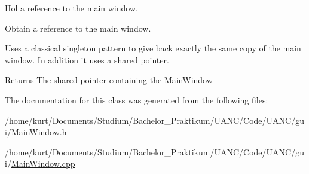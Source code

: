 Hol a reference to the main window. 

Obtain a reference to the main window.

Uses a classical singleton pattern to give back exactly the same copy of the main window. In addition it uses a shared pointer.

\begin{DoxyReturn}{Returns}
The shared pointer containing the \hyperlink{classuanc_1_1gui_1_1_main_window}{Main\+Window} 
\end{DoxyReturn}


The documentation for this class was generated from the following files\+:\begin{DoxyCompactItemize}
\item 
/home/kurt/\+Documents/\+Studium/\+Bachelor\+\_\+\+Praktikum/\+U\+A\+N\+C/\+Code/\+U\+A\+N\+C/gui/\hyperlink{_main_window_8h}{Main\+Window.\+h}\item 
/home/kurt/\+Documents/\+Studium/\+Bachelor\+\_\+\+Praktikum/\+U\+A\+N\+C/\+Code/\+U\+A\+N\+C/gui/\hyperlink{_main_window_8cpp}{Main\+Window.\+cpp}\end{DoxyCompactItemize}
